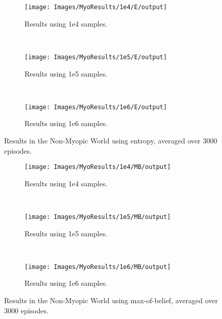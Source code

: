 \begin{figure}[ht]
        \centering
        \begin{subfigure}[t]{0.3\textwidth}
                \texttt{[image: Images/MyoResults/1e4/E/output]}
                \caption{Results using 1e4 samples.}
                \label{fig:m4e}
        \end{subfigure}%
        ~ %
        \begin{subfigure}[t]{0.3\textwidth}
                \texttt{[image: Images/MyoResults/1e5/E/output]}
                \caption{Results using 1e5 samples.}
                \label{fig:m5e}
        \end{subfigure}
        ~ %
        \begin{subfigure}[t]{0.3\textwidth}
                \texttt{[image: Images/MyoResults/1e6/E/output]}
                \caption{Results using 1e6 samples.}
                \label{fig:m6e}
        \end{subfigure}
        \caption{Results in the Non-Myopic World using entropy, averaged over 3000 episodes.}
        \label{ref:myoentropyfig}
\end{figure}

\begin{figure}[ht!]
        \centering
        \begin{subfigure}[t]{0.3\textwidth}
                \texttt{[image: Images/MyoResults/1e4/MB/output]}
                \caption{Results using 1e4 samples.}
                \label{fig:m4m}
        \end{subfigure}%
        ~ %
        \begin{subfigure}[t]{0.3\textwidth}
                \texttt{[image: Images/MyoResults/1e5/MB/output]}
                \caption{Results using 1e5 samples.}
                \label{fig:m5m}
        \end{subfigure}
        ~ %
        \begin{subfigure}[t]{0.3\textwidth}
                \texttt{[image: Images/MyoResults/1e6/MB/output]}
                \caption{Results using 1e6 samples.}
                \label{fig:m6m}
        \end{subfigure}
        \caption{Results in the Non-Myopic World using max-of-belief, averaged over 3000 episodes.}
        \label{ref:myombfig}
\end{figure}

